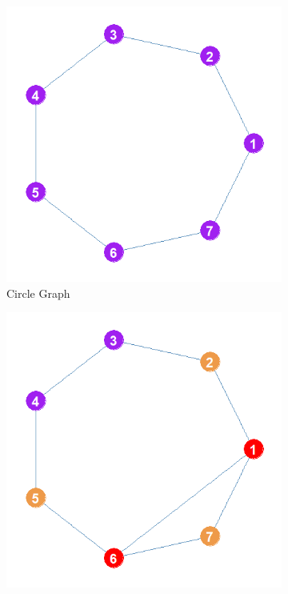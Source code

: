 \documentclass[12pt]{article}
\begin{document}
\begin{figure}
    \captionsetup[subfigure]{font=footnotesize,labelfont=footnotesize}
    \centering
    \begin{subfigure}[b]{0.3\textwidth}
        \includegraphics[width=1.0\textwidth]{Plots/Toys/circle.png}
            \caption{Circle Graph}
            \label{fig:circle}
    \end{subfigure}
    \begin{subfigure}[b]{0.3\textwidth}
        \includegraphics[width=1.0\textwidth]{Plots/Toys/circle-plus-triangle.png}

\end{subfigure}
\end{figure}
\end{document}
